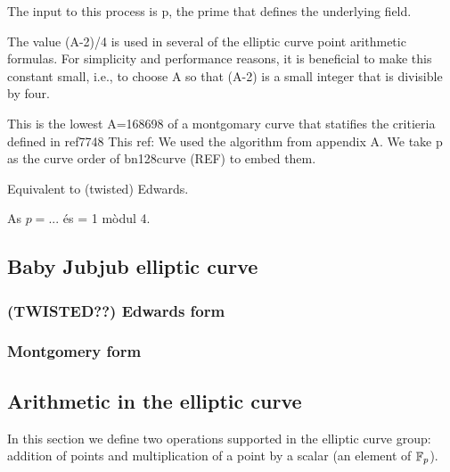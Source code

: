 \documentclass{article}
\begin{document}
The input to this process is p, the prime that defines the
underlying field. 

The value (A-2)/4 is used in several of the elliptic curve point
arithmetic formulas.  For simplicity and performance reasons, it is
beneficial to make this constant small, i.e., to choose A so that
(A-2) is a small integer that is divisible by four.





%	
%	
%		
%	
%	

This is the lowest A=168698 of a montgomary curve that statifies the critieria defined in ref7748
This ref: We used the algorithm from appendix A.%
We take p as the curve order of bn128curve (REF) to embed them.

Equivalent to (twisted) Edwards.

As
$p=...$
és = 1 mòdul 4.
	\subsection{Baby Jubjub elliptic curve}	
		\subsubsection{(TWISTED??) Edwards form}
	
		\subsubsection{Montgomery form}
	
	\subsection{Arithmetic in the elliptic curve}
	In this section we define two operations supported in the elliptic curve group: addition of points and multiplication of a point by a scalar (an element of $\mathbb{F}_p$).
\end{document}
